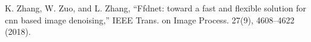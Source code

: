 K. Zhang, W. Zuo, and L. Zhang, “Ffdnet: toward a fast and flexible solution for cnn based image denoising,” IEEE Trans. on Image Process. 27(9), 4608–4622 (2018).

